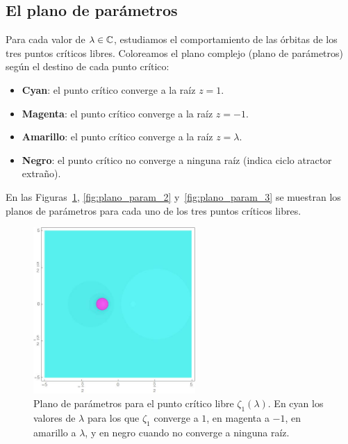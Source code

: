 \subsection{El plano de parámetros}

Para cada valor de $\lambda\in\mathbb{C}$, estudiamos el comportamiento de las órbitas de los tres puntos críticos libres. Coloreamos el plano complejo (plano de parámetros) según el destino de cada punto crítico:
\begin{itemize}
\item \textbf{Cyan}: el punto crítico converge a la raíz $z=1$.
\item \textbf{Magenta}: el punto crítico converge a la raíz $z=-1$.
\item \textbf{Amarillo}: el punto crítico converge a la raíz $z=\lambda$.
\item \textbf{Negro}: el punto crítico no converge a ninguna raíz (indica ciclo atractor extraño).
\end{itemize}

En las Figuras~\ref{fig:plano_param_1}, \ref{fig:plano_param_2} y~\ref{fig:plano_param_3} se muestran los planos de parámetros para cada uno de los tres puntos críticos libres.

\begin{figure}[H]
\centering 
\includegraphics[width=0.55\textwidth]{fuentes/articulo-cuadraticos/imagenes/sch_m_5n_1.jpg}
\caption{Plano de parámetros para el punto crítico libre $\zeta_1(\lambda)$. En cyan los valores de $\lambda$ para los que $\zeta_1$ converge a $1$, en magenta a $-1$, en amarillo a $\lambda$, y en negro cuando no converge a ninguna raíz.}
\label{fig:plano_param_1}
\end{figure}


